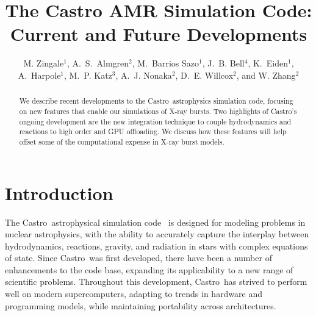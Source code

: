 \documentclass[a4paper]{jpconf}
\newcommand{\castro}{{\sffamily Castro}}
\begin{document}
\title{The Castro AMR Simulation Code: Current and Future Developments}

\author{M. Zingale$^1$,
        A.~S.~Almgren$^2$,
        M.~Barrios Sazo$^1$,
        J.~B. Bell$^4$,
        K.~Eiden$^1$,
        A.~Harpole$^1$,
        M.~P. Katz$^3$,
        A.~J. Nonaka$^2$,
        D.~E. Willcox$^2$, and
        W. Zhang$^2$}

\address{$^1$Department of Physics and Astronomy, Stony Brook
  University, Stony Brook, NY 11794-3800 USA}

\address{$^2$Center for Computational Sciences and Engineering,
  Lawrence Berkeley National Lab, Berkeley, CA 94720 USA}

\address{$^3$NVIDIA Corporation, 2788 San Tomas Expressway,
  Santa Clara, CA, 95051 USA}


\begin{abstract}
We describe recent developments to the \castro\ astrophysics
simulation code, focusing on new features that enable our simulations
of X-ray bursts.  Two highlights of \castro's ongoing development are
the new integration technique to couple hydrodynamics and reactions to
high order and GPU offloading.  We discuss how these features will
help offset some of the computational expense in X-ray burst models.
\end{abstract}



\section{Introduction}

The \castro\ astrophysical simulation code~\cite{castro} is designed
for modeling problems in nuclear astrophysics, with the ability to
accurately capture the interplay between hydrodynamics, reactions,
gravity, and radiation in stars with complex equations of state.
Since \castro\ was first developed, there have been a number of
enhancements to the code base, expanding its applicability to a new
range of scientific problems.  Throughout this development,
\castro\ has strived to perform well on modern supercomputers,
adapting to trends in hardware and programming models, while
maintaining portability across architectures.
\end{document}
